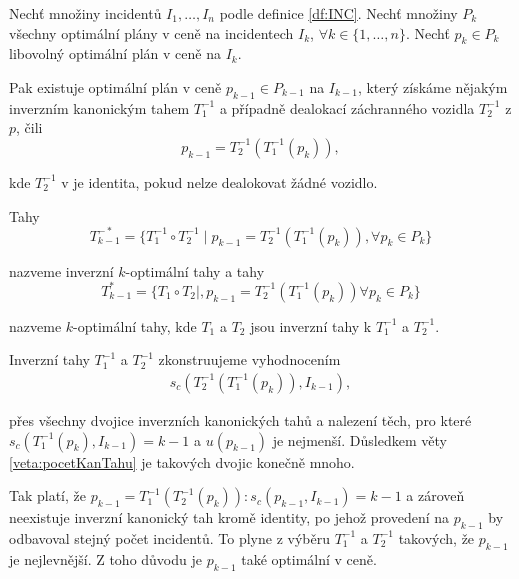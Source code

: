 \begin{veta}\label{veta:vztahOptim}
  Nechť množiny incidentů $I_1, \dots, I_n$ podle definice \ref{df:INC}.
  Nechť množiny $P_{k}$ všechny optimální plány v ceně na incidentech $I_k$, $\forall k \in \{ 1, \dots, n \}$.
  Nechť $p_k \in P_k$ libovolný optimální plán v ceně na $I_k$.

  Pak existuje optimální plán v ceně $p_{k-1} \in P_{k-1}$ na $I_{k-1}$, který získáme nějakým inverzním kanonickým tahem $T^{-1}_1$ a případně dealokací záchranného vozidla $T^{-1}_2$ z $p$,
  čili
  \begin{equation*}
    p_{k-1} = T^{-1}_2(T^{-1}_1(p_k)),
  \end{equation*}

  kde $T^{-1}_2$ v je identita, pokud nelze dealokovat žádné vozidlo.

  Tahy 
  \begin{equation*}
    T^{-*}_{k-1} = \{ T^{-1}_1 \circ T^{-1}_2 \mid p_{k-1} = T^{-1}_2(T^{-1}_1(p_k)), \forall p_k \in P_k \}
  \end{equation*}

  nazveme inverzní $k$-optimální tahy a tahy
  \begin{equation*}
    T^{*}_{k-1} = \{ T_1 \circ T_2 \mid , p_{k-1} = T^{-1}_2(T^{-1}_1(p_k)) \forall p_k \in P_k \}
  \end{equation*}

  nazveme $k$-optimální tahy, kde $T_1$ a $T_2$ jsou inverzní tahy k $T^{-1}_1$ a $T^{-1}_2$.

\end{veta}
\begin{dukaz}
  Inverzní tahy $T^{-1}_1$ a $T^{-1}_2$ zkonstruujeme vyhodnocením 
  \begin{align*}
  s_c(T^{-1}_2(T^{-1}_1(p_{k})), I_{k-1}),
  \end{align*}

  přes všechny dvojice inverzních kanonických tahů a nalezení těch,
  pro které $s_c(T^{-1}_1(p_{k}), I_{k-1}) = k-1$ a $u(p_{k-1})$ je nejmenší.
  Důsledkem věty \ref{veta:pocetKanTahu} je takových dvojic konečně mnoho.

  Tak platí, že $p_{k-1} = T^{-1}_1(T^{-1}_2(p_{k})) \colon s_c(p_{k-1}, I_{k-1}) = k-1$ a zároveň neexistuje inverzní kanonický tah kromě identity,
  po jehož provedení na $p_{k-1}$ by odbavoval stejný počet incidentů. To plyne z výběru $T^{-1}_1$ a $T^{-1}_2$ takových, že $p_{k-1}$ je nejlevnější.
  Z toho důvodu je $p_{k-1}$ také optimální v ceně.
\end{dukaz}

